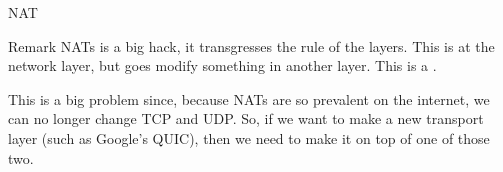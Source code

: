 \documentclass[a4paper]{article}
\begin{document}
\begin{parag}{NAT}
    \begin{subparag}{Remark}
        NATs is a big hack, it transgresses the rule of the layers. This is at the network layer, but goes modify something in another layer. This is a .

        This is a big problem since, because NATs are so prevalent on the internet, we can no longer change TCP and UDP. So, if we want to make a new transport layer (such as Google's QUIC), then we need to make it on top of one of those two.
    \end{subparag}
\end{parag}
\end{document}
